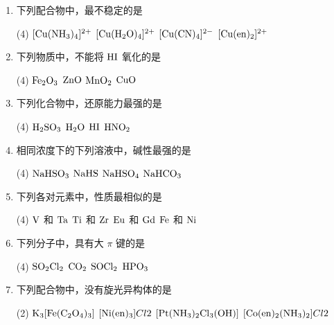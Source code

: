 \begin{enumerate}[label=\arabic*., itemsep=1.5ex]
    \item 下列配合物中，最不稳定的是
    \begin{tasks}(4)
        \task $[\ce{Cu(NH3)4}]^{2+}$
        \task $[\ce{Cu(H2O)4}]^{2+}$
        \task $[\ce{Cu(CN)4}]^{2-}$
        \task $[\ce{Cu(en)2}]^{2+}$
    \end{tasks}

    \item 下列物质中，不能将 $\ce{HI}$ 氧化的是
    \begin{tasks}(4)
        \task $\ce{Fe2O3}$
        \task $\ce{ZnO}$
        \task $\ce{MnO2}$
        \task $\ce{CuO}$
    \end{tasks}

    \item 下列化合物中，还原能力最强的是
    \begin{tasks}(4)
        \task $\ce{H2SO3}$
        \task $\ce{H2O}$
        \task $\ce{HI}$
        \task $\ce{HNO2}$
    \end{tasks}

    \item 相同浓度下的下列溶液中，碱性最强的是
    \begin{tasks}(4)
        \task $\ce{NaHSO3}$
        \task $\ce{NaHS}$
        \task $\ce{NaHSO4}$
        \task $\ce{NaHCO3}$
    \end{tasks}

    \item 下列各对元素中，性质最相似的是
    \begin{tasks}(4)
        \task $\ce{V}$ 和 $\ce{Ta}$
        \task $\ce{Ti}$ 和 $\ce{Zr}$
        \task $\ce{Eu}$ 和 $\ce{Gd}$
        \task $\ce{Fe}$ 和 $\ce{Ni}$
    \end{tasks}

    \item 下列分子中，具有大 $\pi$ 键的是
    \begin{tasks}(4)
        \task $\ce{SO2Cl2}$
        \task $\ce{CO2}$
        \task $\ce{SOCl2}$
        \task $\ce{HPO3}$
    \end{tasks}

    \item 下列配合物中，没有旋光异构体的是
    \begin{tasks}(2)
        \task $\ce{K3[Fe(C2O4)3]}$
        \task $[\ce{Ni(en)3}]Cl2$
        \task $[\ce{Pt(NH3)2Cl3(OH)}]$
        \task $[\ce{Co(en)2(NH3)2}]Cl2$
    \end{tasks}


\end{enumerate}
